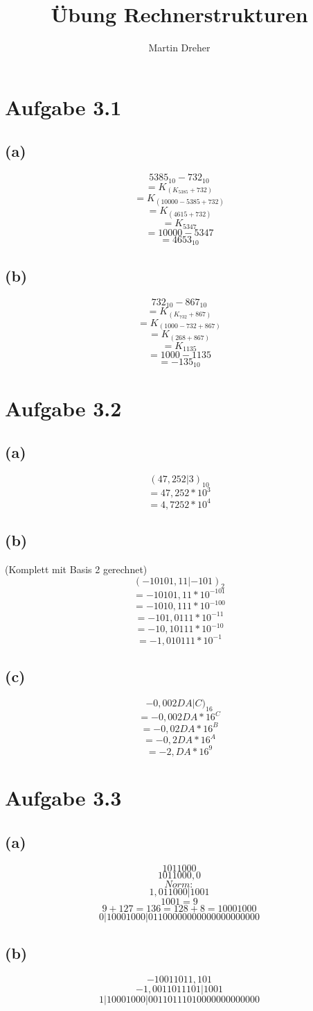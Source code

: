 \documentclass[12pt,a4paper]{article}
\author{Martin Dreher}
\title{Übung Rechnerstrukturen}
\begin{document}
 

\section*{Aufgabe 3.1}
\subsection*{(a)}
\[5385_{10} - 732_{10}\]
\[= K_(K_5385 + 732)\]
\[= K_(10000-5385 + 732)\]
\[= K_(4615 + 732)\]
\[= K_5347\]
\[= 10000-5347\]
\[= 4653_10\]
\subsection*{(b)}
\[732_{10} - 867_{10}\]
\[= K_(K_732 + 867)\]
\[= K_(1000-732 + 867)\]
\[= K_(268 + 867)\]
\[= K_1135\]
\[= 1000-1135\]
\[= -135_10\]

\section*{Aufgabe 3.2}
\subsection*{(a)}
\[(47,252|3)_{10}\]
\[= 47,252 * 10^3\]
\[= 4,7252 * 10^4\]
\subsection*{(b)} (Komplett mit Basis 2 gerechnet)
\[(-10101,11|-101)_2\]
\[= -10101,11 * 10^{-101}\]
\[= -1010,111 * 10^{-100}\]
\[= -101,0111 * 10^{-11}\]
\[= -10,10111 * 10^{-10}\]
\[= -1,010111 * 10^{-1}\]
\subsection*{(c)}
\[-0,002DA|C)_{16}\]
\[= -0,002DA * 16^C\]
\[= -0,02DA * 16^B\]
\[= -0,2DA * 16^A\]
\[= -2,DA * 16^9\]

\section*{Aufgabe 3.3}
\subsection*{(a)}
\[101 1000\]
\[1011000,0\]
\[Norm:\]
\[1,011000 | 1001\]
\[1001 = 9\]
\[9 + 127 = 136 = 128 + 8 = 10001000\]
\[0 | 10001000 | 01100000000000000000000\]
\subsection*{(b)}
\[-10011011,101\]
\[-1,0011011101 | 1001\]
\[1 | 10001000 | 00110111010000000000000\]
\end{document}
